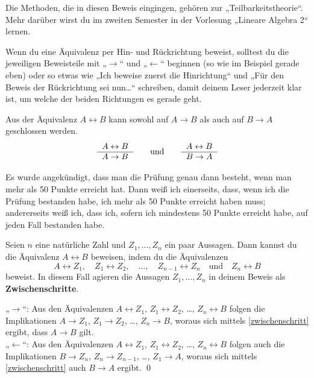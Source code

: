 \begin{bem}
Die Methoden, die in diesen Beweis eingingen, gehören zur „Teilbarkeitstheorie“. Mehr darüber wirst du im zweiten Semester in der Vorlesung „Lineare Algebra 2“ lernen.
\end{bem}


\begin{bem}[Signalwörter]
Wenn du eine Äquivalenz per Hin- und Rückrichtung beweist, solltest du die jeweiligen Beweisteile mit „$\to$“ und „$\leftarrow$“ beginnen (so wie im Beispiel gerade eben) oder so etwas wie „Ich beweise zuerst die Hinrichtung“ und „Für den Beweis der Rückrichtung sei nun\dots“ schreiben, damit deinem Leser jederzeit klar ist, um welche der beiden Richtungen es gerade geht.
\end{bem}

\begin{axi}
 Aus der Äquivalenz $A\leftrightarrow B$ kann sowohl auf $A\to B$ als auch auf $B\to A$ geschlossen werden.
 \[ \begin{tabular}{r}
     $A\leftrightarrow B$ \\
     \hline 
     $A\to B$ 
    \end{tabular} \qquad\text{und}\qquad \begin{tabular}{r}
     $A\leftrightarrow B$ \\
     \hline 
     $B\to A$ 
    \end{tabular}\]
\end{axi}



\begin{bsp}
 Es wurde angekündigt, dass man die Prüfung genau dann besteht, wenn man mehr als 50 Punkte erreicht hat. Dann weiß ich einerseits, dass, wenn ich die Prüfung bestanden habe, ich mehr als 50 Punkte erreicht haben muss; andererseits weiß ich, dass ich, sofern ich mindestens 50 Punkte erreicht habe, auf jeden Fall bestanden habe.
\end{bsp}




\begin{sat} \label{trans:toto}
Seien $n$ eine natürliche Zahl und $Z_1,\dots , Z_n$ ein paar Aussagen. Dann kannst du die Äquivalenz $A\leftrightarrow B$ beweisen, indem du die Äquivalenzen
\[ A\leftrightarrow Z_1,\quad Z_1\leftrightarrow Z_2,\quad \dots,\quad Z_{n-1}\leftrightarrow Z_n \quad\text{und}\quad Z_n\leftrightarrow B \]
beweist. In diesem Fall agieren die Aussagen $Z_1,\dots , Z_n$ in deinem Beweis als \textbf{Zwischenschritte}.
\end{sat}
\begin{bew}
„$\to$“: Aus den Äquivalenzen $A\leftrightarrow Z_1$, $Z_1\leftrightarrow Z_2$, \dots, $Z_n\leftrightarrow B$ folgen die Implikationen $A\to Z_1$, $Z_1\to Z_2$, \dots, $Z_n\to B$, woraus sich mittels \cref{zwischenschritt} ergibt, dass $A\to B$ gilt. \\
„$\leftarrow$“: Aus den Äquivalenzen $A\leftrightarrow Z_1$, $Z_1\leftrightarrow Z_2$, \dots, $Z_n\leftrightarrow B$ folgen auch die Implikationen $B\to Z_n$, $Z_n\to Z_{n-1}$, \dots, $Z_1\to A$, woraus sich mittels \cref{zwischenschritt} auch $B\to A$ ergibt. \qed
\end{bew}


